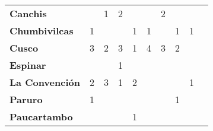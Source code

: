 \begin{tabular}{lccccccccc}
	\textbf{Canchis}                            
	&\cellcolor[HTML]{FCC46C}  					& 1                 			  &2                     
	&\cellcolor[HTML]{FCC46C}                   &\cellcolor[HTML]{FCC46C}         &2                  				  
	&\cellcolor[HTML]{FCC46C}                   &\cellcolor[HTML]{FCC46C} 		  &\cellcolor[HTML]{FCC46C} \\
	\textbf{Chumbivilcas}                      
	&1                 				  			&\cellcolor[HTML]{FCC46C}        &\cellcolor[HTML]{FCC46C}                   &1                    						&1                               &\cellcolor[HTML]{FCC46C}                   &1            								&1    							 &\cellcolor[HTML]{FCC46C} \\
	\textbf{Cusco}                             
	&3 				     						&2                  			 &3                    				
	&1                                          &4                    			 &3                  
	&2                 							&\cellcolor[HTML]{FCC46C}    	 &\cellcolor[HTML]{FCC46C} \\
	\textbf{Espinar}       					   
	&\cellcolor[HTML]{FCC46C}  			        &\cellcolor[HTML]{FCC46C}        &1                						   
	&\cellcolor[HTML]{FCC46C}                   &\cellcolor[HTML]{FCC46C}        &\cellcolor[HTML]{FCC46C}                 &\cellcolor[HTML]{FCC46C}                   &\cellcolor[HTML]{FCC46C}  		 &\cellcolor[HTML]{FCC46C}\\
	\textbf{La Convención}                     
	&2 				 							&3                               &1                     					   &2                   						&\cellcolor[HTML]{FCC46C}        &\cellcolor[HTML]{FCC46C}                   &\cellcolor[HTML]{FCC46C}               	&1 								 &\cellcolor[HTML]{FCC46C}\\
	\textbf{Paruro}                            
	&1 											&\cellcolor[HTML]{FCC46C}       	 &\cellcolor[HTML]{FCC46C}              	    &\cellcolor[HTML]{FCC46C}                   &\cellcolor[HTML]{FCC46C}              	    &\cellcolor[HTML]{FCC46C}        &1                   			 &\cellcolor[HTML]{FCC46C}   				
	&\cellcolor[HTML]{FCC46C} \\
	\textbf{Paucartambo}               		   
	&\cellcolor[HTML]{FCC46C}  				    &\cellcolor[HTML]{FCC46C}        &\cellcolor[HTML]{FCC46C}                      
	&1                          				& \cellcolor[HTML]{FCC46C}       &\cellcolor[HTML]{FCC46C}                      
	&\cellcolor[HTML]{FCC46C}                   & \cellcolor[HTML]{FCC46C} 		 &\cellcolor[HTML]{FCC46C}\\

\end{tabular}
